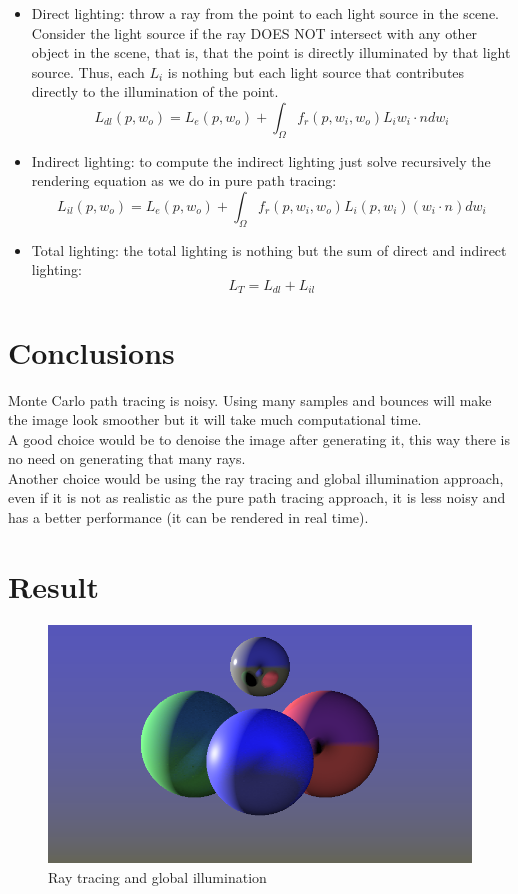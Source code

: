 \documentclass{article}
\begin{document}
\begin{itemize}
  \item Direct lighting: throw a ray from the point to each light source in the scene. Consider the light source if the ray DOES NOT intersect with any other object in the scene, that is, that the point is directly illuminated by that light source.
  Thus, each $L_i$ is nothing but each light source that contributes directly to the illumination of the point.
  $$L_{dl} \left (  p, w_{o} \right ) = L_{e} \left (  p, w_{o} \right ) + \int_{\Omega} f_{r}\left (  p, w_{i}, w_{o} \right ) L_{i} w_{i} \cdot n dw_{i}$$
  \item Indirect lighting: to compute the indirect lighting just solve recursively the rendering equation as we do in pure path tracing:
  $$L_{il} \left (  p, w_{o} \right ) = L_{e} \left (  p, w_{o} \right ) + \int_{\Omega} f_{r}\left (  p, w_{i}, w_{o} \right ) L_{i} \left (  p, w_{i} \right ) \left(w_{i} \cdot n \right) dw_{i}$$
  \item Total lighting: the total lighting is nothing but the sum of direct and indirect lighting:
  $$L_T = L_{dl} + L_{il}$$
\end{itemize}

\section{Conclusions}

Monte Carlo path tracing is noisy. Using many samples and bounces will make the image look smoother but it will take much computational time.
\\
A good choice would be to denoise the image after generating it, this way there is no need on generating that many rays.
\\
Another choice would be using the ray tracing and global illumination approach, even if it is not as realistic as the pure path tracing approach, it is less noisy and has a better performance (it can be rendered in real time).

\section{Result}

\begin{figure}[h]
\centering
\includegraphics[scale=0.5]{raytracingGI.png}
\caption{Ray tracing and global illumination}
\label{fig:Ray tracing and global illumination}
\end{figure}
\end{document}
